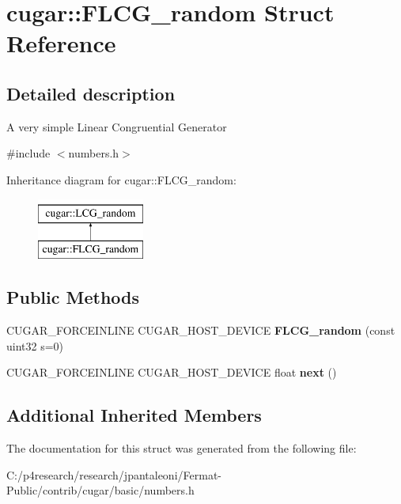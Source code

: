 \hypertarget{structcugar_1_1_f_l_c_g__random}{}\section{cugar\+:\+:F\+L\+C\+G\+\_\+random Struct Reference}
\label{structcugar_1_1_f_l_c_g__random}


\subsection{Detailed description}
A very simple Linear Congruential Generator 

{\ttfamily \#include $<$numbers.\+h$>$}

Inheritance diagram for cugar\+:\+:F\+L\+C\+G\+\_\+random\+:\begin{figure}[H]
\begin{center}
\leavevmode
\includegraphics[height=2.000000cm]{structcugar_1_1_f_l_c_g__random}
\end{center}
\end{figure}
\subsection*{Public Methods}
\begin{DoxyCompactItemize}
\item 
\mbox{\label{structcugar_1_1_f_l_c_g__random_af977671a37fbcfbee953cda8dd7e14f9}} 
C\+U\+G\+A\+R\+\_\+\+F\+O\+R\+C\+E\+I\+N\+L\+I\+NE C\+U\+G\+A\+R\+\_\+\+H\+O\+S\+T\+\_\+\+D\+E\+V\+I\+CE {\bfseries F\+L\+C\+G\+\_\+random} (const uint32 s=0)
\item 
\mbox{\label{structcugar_1_1_f_l_c_g__random_a58c9ed5f21c6cdcca8323dca1372262a}} 
C\+U\+G\+A\+R\+\_\+\+F\+O\+R\+C\+E\+I\+N\+L\+I\+NE C\+U\+G\+A\+R\+\_\+\+H\+O\+S\+T\+\_\+\+D\+E\+V\+I\+CE float {\bfseries next} ()
\end{DoxyCompactItemize}
\subsection*{Additional Inherited Members}


The documentation for this struct was generated from the following file\+:\begin{DoxyCompactItemize}
\item 
C\+:/p4research/research/jpantaleoni/\+Fermat-\/\+Public/contrib/cugar/basic/numbers.\+h\end{DoxyCompactItemize}
